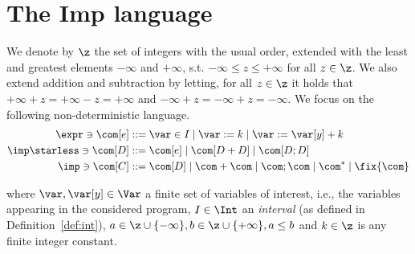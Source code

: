 \section{The Imp language}

We denote by \(\z\) the set of integers with the usual order, extended
with the least and greatest elements \(-\infty\) and \(+\infty\), s.t.
\(-\infty \leq z \leq +\infty\) for all \(z \in \z\). We also extend
addition and subtraction by letting, for all \(z \in \z\) it holds
that \(+\infty + z = + \infty - z = + \infty\) and
\(-\infty + z = -\infty + z = -\infty\).  We focus on the following
non-deterministic language.
\begin{align*}
  \expr \ni \com[e] ::= & \; \var \in I %
                          \mid \var := k \mid \var := \var[y] + k %
  \\
  \imp\starless \ni \com[D] ::= & \; \com[e] \mid \com[D + D] \mid \com[D ; D] \\
  \imp \ni \com[C] ::= & \; \com[D] \mid \com + \com \mid \com ; \com \mid \com^* \mid \fix{\com}
\end{align*}

where \(\var, \var[y] \in \Var\) a finite set of variables of
interest, i.e., the variables appearing in the considered program,
\(I\in\Int\) an \emph{interval} (as defined in
Definition~\ref{def:int}),
\({a \in \z \cup \{-\infty\}}, {b \in \z \cup\{+\infty\}}, {a\leq b}\)
and \({k \in \z}\) is any finite integer constant.
